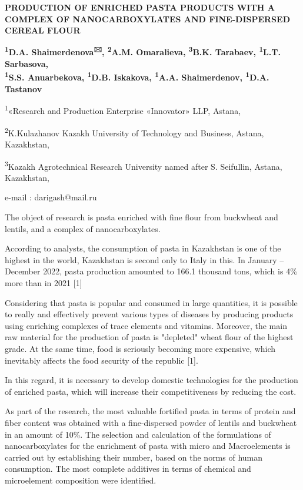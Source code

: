 {\bfseries PRODUCTION OF ENRICHED PASTA PRODUCTS WITH A COMPLEX OF
NANOCARBOXYLATES AND FINE-DISPERSED CEREAL FLOUR}

{\bfseries \textsuperscript{1}D.A. Shaimerdenova\textsuperscript{🖂},
\textsuperscript{2}A.M. Omaralieva, \textsuperscript{3}B.K. Tarabaev,
\textsuperscript{1}L.T. Sarbasova,\\
\textsuperscript{1}S.S. Anuarbekova, \textsuperscript{1}D.B. Iskakova,
\textsuperscript{1}A.A. Shaimerdenov, \textsuperscript{1}D.A. Tastanov}

\textsuperscript{1}«Research and Production Enterprise «Innovator» LLP,
Astana,

\textsuperscript{2}K.Kulazhanov Kazakh University of Technology and
Business, Astana, Kazakhstan,

\textsuperscript{3}Kazakh Agrotechnical Research University named after
S. Seifullin, Astana, Kazakhstan,

e-mail : darigash@mail.ru

The object of research is pasta enriched with fine flour from buckwheat
and lentils, and a complex of nanocarboxylates.

According to analysts, the consumption of pasta in Kazakhstan is one of
the highest in the world, Kazakhstan is second only to Italy in this. In
January -- December 2022, pasta production amounted to 166.1 thousand
tons, which is 4\% more than in 2021 {[}1{]}

Considering that pasta is popular and consumed in large quantities, it
is possible to really and effectively prevent various types of diseases
by producing products using enriching complexes of trace elements and
vitamins. Moreover, the main raw material for the production of pasta is
"depleted" wheat flour of the highest grade. At the same time, food is
seriously becoming more expensive, which inevitably affects the food
security of the republic {[}1{]}.

In this regard, it is necessary to develop domestic technologies for the
production of enriched pasta, which will increase their competitiveness
by reducing the cost.

As part of the research, the most valuable fortified pasta in terms of
protein and fiber content was obtained with a fine-dispersed powder of
lentils and buckwheat in an amount of 10\%. The selection and
calculation of the formulations of nanocarboxylates for the enrichment
of pasta with micro and Macroelements is carried out by establishing
their number, based on the norms of human consumption. The most complete
additives in terms of chemical and microelement composition were
identified.

